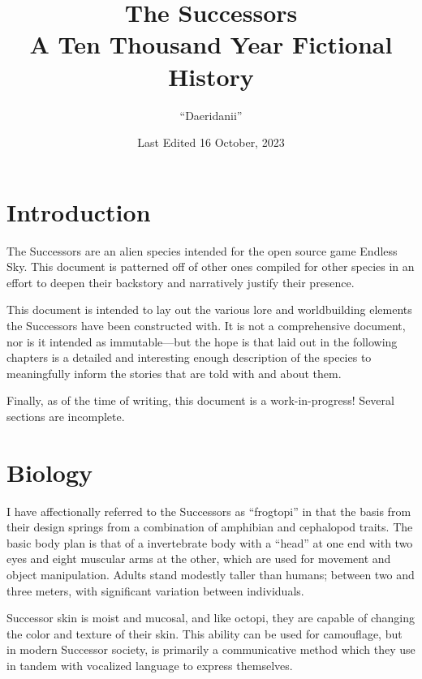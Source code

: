 \documentclass[11pt]{report}
\title{%
    The Successors \\ 
    \smallskip
    \large A Ten Thousand Year Fictional History}
\author{``Daeridanii''}
\date{Last Edited 16 October, 2023}
\begin{document}
    \maketitle
    \tableofcontents
    \newpage
    \section{Introduction}
    The Successors are an alien species intended for the open source game Endless Sky. This document is patterned off of other ones compiled for other species in an effort to deepen their backstory and narratively justify their presence.
    
    This document is intended to lay out the various lore and worldbuilding elements the Successors have been constructed with. It is not a comprehensive document, nor is it intended as immutable---but the hope is that laid out in the following chapters is a detailed and interesting enough description of the species to meaningfully inform the stories that are told with and about them.

    Finally, as of the time of writing, this document is a work-in-progress! Several sections are incomplete.

    \section{Biology}
    I have affectionally referred to the Successors as ``frogtopi'' in that the basis from their design springs from a combination of amphibian and cephalopod traits. The basic body plan is that of a invertebrate body with a ``head'' at one end with two eyes and eight muscular arms at the other, which are used for movement and object manipulation. Adults stand modestly taller than humans; between two and three meters, with significant variation between individuals. 

    Successor skin is moist and mucosal, and like octopi, they are capable of changing the color and texture of their skin. This ability can be used for camouflage, but in modern Successor society, is primarily a communicative method which they use in tandem with vocalized language to express themselves.
    
\end{document}
